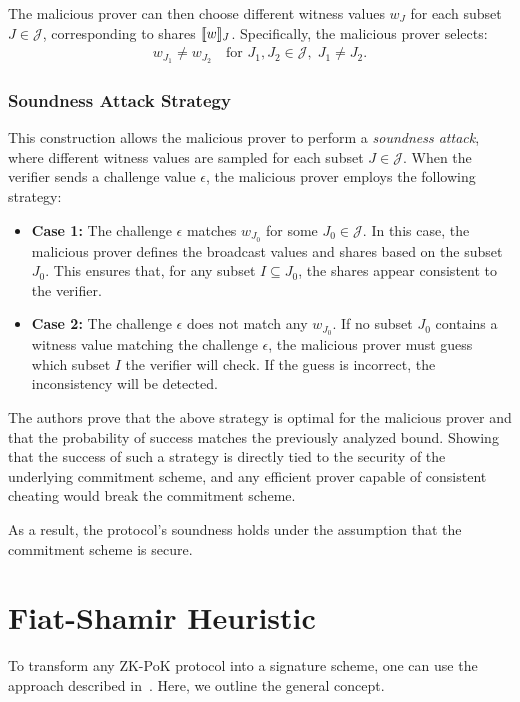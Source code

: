 \documentclass[11pt]{report}
\theoremstyle{definition}
\theoremstyle{plain}
\begin{document}
The malicious prover can then choose different witness values $w_J$ for each subset $J \in \mathcal{J}$, corresponding to shares $\llbracket w \rrbracket_J$. Specifically, the malicious prover selects:
\begin{align}
  w_{J_1} \neq w_{J_2} \quad \text{for } J_1, J_2 \in \mathcal{J}, \; J_1 \neq J_2.
\end{align}

\subsubsection{Soundness Attack Strategy}
This construction allows the malicious prover to perform a \textit{soundness attack}, where different witness values are sampled for each subset $J \in \mathcal{J}$. When the verifier sends a challenge value $\epsilon$, the malicious prover employs the following strategy:
\begin{itemize}
  \item \textbf{Case 1:} The challenge $\epsilon$ matches $w_{J_0}$ for some $J_0 \in \mathcal{J}$.
        In this case, the malicious prover defines the broadcast values and shares based on the subset $J_0$. This ensures that, for any subset $I \subseteq J_0$, the shares appear consistent to the verifier.

  \item \textbf{Case 2:} The challenge $\epsilon$ does not match any $w_{J_0}$.
        If no subset $J_0$ contains a witness value matching the challenge $\epsilon$, the malicious prover must guess which subset $I$ the verifier will check. If the guess is incorrect, the inconsistency will be detected.
\end{itemize}

The authors prove that the above strategy is optimal for the malicious prover and that the probability of success matches the previously analyzed bound. Showing that the success of such a strategy is directly tied to the security of the underlying commitment scheme, and any efficient prover capable of consistent cheating would break the commitment scheme.

As a result, the protocol's soundness holds under the assumption that the commitment scheme is secure.


\section{Fiat-Shamir Heuristic}\label{sec:fiatshamir}
To transform any ZK-PoK protocol into a signature scheme, one can use the approach described in~\cite{fiat1986prove}. Here, we outline the general concept.
\end{document}
